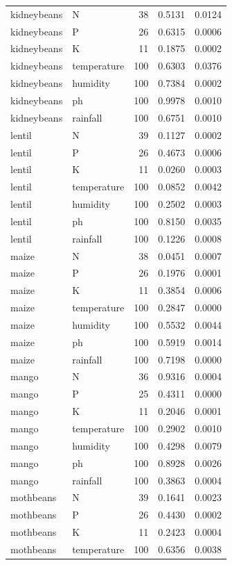 \begin{tabular}{llrrr}
kidneybeans & N & 38 & 0.5131 & 0.0124 \\
kidneybeans & P & 26 & 0.6315 & 0.0006 \\
kidneybeans & K & 11 & 0.1875 & 0.0002 \\
kidneybeans & temperature & 100 & 0.6303 & 0.0376 \\
kidneybeans & humidity & 100 & 0.7384 & 0.0002 \\
kidneybeans & ph & 100 & 0.9978 & 0.0010 \\
kidneybeans & rainfall & 100 & 0.6751 & 0.0010 \\
lentil & N & 39 & 0.1127 & 0.0002 \\
lentil & P & 26 & 0.4673 & 0.0006 \\
lentil & K & 11 & 0.0260 & 0.0003 \\
lentil & temperature & 100 & 0.0852 & 0.0042 \\
lentil & humidity & 100 & 0.2502 & 0.0003 \\
lentil & ph & 100 & 0.8150 & 0.0035 \\
lentil & rainfall & 100 & 0.1226 & 0.0008 \\
maize & N & 38 & 0.0451 & 0.0007 \\
maize & P & 26 & 0.1976 & 0.0001 \\
maize & K & 11 & 0.3854 & 0.0006 \\
maize & temperature & 100 & 0.2847 & 0.0000 \\
maize & humidity & 100 & 0.5532 & 0.0044 \\
maize & ph & 100 & 0.5919 & 0.0014 \\
maize & rainfall & 100 & 0.7198 & 0.0000 \\
mango & N & 36 & 0.9316 & 0.0004 \\
mango & P & 25 & 0.4311 & 0.0000 \\
mango & K & 11 & 0.2046 & 0.0001 \\
mango & temperature & 100 & 0.2902 & 0.0010 \\
mango & humidity & 100 & 0.4298 & 0.0079 \\
mango & ph & 100 & 0.8928 & 0.0026 \\
mango & rainfall & 100 & 0.3863 & 0.0004 \\
mothbeans & N & 39 & 0.1641 & 0.0023 \\
mothbeans & P & 26 & 0.4430 & 0.0002 \\
mothbeans & K & 11 & 0.2423 & 0.0004 \\
mothbeans & temperature & 100 & 0.6356 & 0.0038 \\

\end{tabular}
